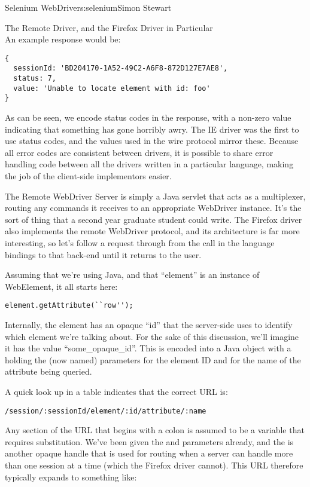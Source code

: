 \begin{aosachapter}{Selenium WebDriver}{s:selenium}{Simon Stewart}
\begin{aosasect1}{The Remote Driver, and the Firefox Driver in Particular}
~\\

\noindent
An example response would be:

\begin{verbatim}
{
  sessionId: 'BD204170-1A52-49C2-A6F8-872D127E7AE8',
  status: 7,
  value: 'Unable to locate element with id: foo'
}
\end{verbatim}

\noindent As can be seen, we encode status codes in the response, with a
non-zero value indicating that something has gone horribly awry. The
IE driver was the first to use status codes, and the values used in
the wire protocol mirror these. Because all error codes are consistent
between drivers, it is possible to share error handling code between
all the drivers written in a particular language, making the job of
the client-side implementors easier.

The Remote WebDriver Server is simply a Java servlet that acts as a
multiplexer, routing any commands it receives to an appropriate
WebDriver instance. It's the sort of thing that a second year graduate
student could write. The Firefox driver also implements the remote
WebDriver protocol, and its architecture is far more interesting, so
let's follow a request through from the call in the language bindings
to that back-end until it returns to the user.

\pagebreak

Assuming that we're using Java, and that ``element'' is an instance of
WebElement, it all starts here:

\begin{verbatim}
element.getAttribute(``row'');
\end{verbatim}

\noindent Internally, the element has an opaque ``id'' that the server-side uses
to identify which element we're talking about. For the sake of this
discussion, we'll imagine it has the value ``some\_opaque\_id''. This
is encoded into a Java  object with a  holding
the (now named) parameters  for the element ID
and  for the name of the attribute being queried.

A quick look up in a table indicates that the correct URL is:

\begin{verbatim}
/session/:sessionId/element/:id/attribute/:name
\end{verbatim}

\noindent Any section of the URL that begins with a colon is assumed to be a
variable that requires substitution. We've been given the 
and  parameters already, and the  is
another opaque handle that is used for routing when a server can
handle more than one session at a time (which the Firefox driver
cannot). This URL therefore typically expands to something like:


\end{aosasect1}
\end{aosachapter}
